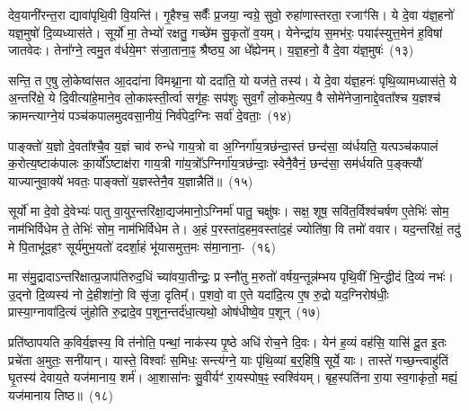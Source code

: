 देव॒यानी॑रन्त॒रा द्यावा॑\-पृथि॒वी वि॒यन्ति॑। गृ॒हैश्च॒ सर्वैः᳚ प्र॒जया॒ न्वग्रे॒ सुवो॒ रुहा॑णास्तरता॒ रजाꣳ॑सि। ये दे॒वा य॑ज्ञ॒हनो॑ यज्ञ॒मुषो॑ दि॒व्यध्यास॑ते। सूर्यो॑ मा॒ तेभ्यो॑ रक्षतु॒ गच्छे॑म सु॒कृतो॑ व॒यम्। येनेन्द्रा॑य स॒मभ॑रः॒ पयाꣴ॑स्युत्त॒\-मेन॑ ह॒विषा॑ जातवेदः। तेना᳚ग्ने॒ त्वमु॒त व॑र्धये॒मꣳ स॑जा॒ताना॒ꣴ॒ श्रैष्ठ्य॒ आ धे᳚ह्येनम्। य॒ज्ञ॒हनो॒ वै दे॒वा य॑ज्ञ॒मुषः॑~(१३)\ip

सन्ति॒ त ए॒षु लो॒केष्वा॑सत आ॒ददा॑ना विमथ्ना॒ना यो ददा॑ति॒ यो यज॑ते॒ तस्य॑। ये दे॒वा य॑ज्ञ॒हनः॑ पृथि॒व्यामध्यास॑ते॒ ये अ॒न्तरि॑क्षे॒ ये दि॒वीत्या॑हे॒माने॒व लो॒काꣴस्ती॒र्त्वा सगृ॑हः॒ सप॑शुः सुव॒र्गं लो॒कमे॒त्यप॒ वै सोमे॑नेजा॒नाद्दे॒वता᳚श्च य॒ज्ञश्च॑ क्रामन्त्याग्ने॒यं पञ्च॑कपालमुदवसा॒नीयं॒ निर्व॑पेद॒ग्निः सर्वा॑ दे॒वताः॒~(१४)\ip

पाङ्क्तो॑ य॒ज्ञो दे॒वता᳚श्चै॒व य॒ज्ञं चाव॑ रुन्धे गाय॒त्रो वा अ॒ग्निर्गा॑य॒त्रछ॑न्दा॒स्तं छन्द॑सा॒ व्य॑र्धयति॒ यत्पञ्च॑कपालं क॒रोत्य॒ष्टाक॑पालः का॒र्यो᳚\-ऽष्टाक्ष॑रा गाय॒त्री गा॑य॒त्रो᳚\-ऽग्निर्गा॑य॒त्रछ॑न्दाः॒ स्वेनै॒वैनं॒ छन्द॑सा॒ सम॑र्धयति प॒ङ्क्त्यौ॑ याज्यानुवा॒क्ये॑ भवतः॒ पाङ्क्तो॑ य॒ज्ञस्तेनै॒व य॒ज्ञान्नैति॑॥~(१५)\ip

{\anuvakamend[{स॒वि॒त॒र्दे॒वा य॑ज्ञ॒मुषः॒ सर्वा॑ दे॒वता॒स्त्रिच॑त्वारिꣳशच्च}]}

सूर्यो॑ मा दे॒वो दे॒वेभ्यः॑ पातु वा॒युर॒न्तरि॑क्षा॒द्यज॑मानो॒\-ऽग्निर्मा॑ पातु॒ चक्षु॑षः। सक्ष॒ शूष॒ सवि॑त॒र्विश्व॑चर्\mbox{}षण ए॒तेभिः॑ सोम॒ नाम॑भिर्विधेम ते॒ तेभिः॑ सोम॒ नाम॑भिर्विधेम ते। अ॒हं प॒रस्ता॑द॒हम॒वस्ता॑द॒हं ज्योति॑षा॒ वि तमो॑ ववार। यद॒न्तरि॑क्षं॒ तदु॑ मे पि॒ताभू॑द॒हꣳ सूर्य॑मुभ॒यतो॑ ददर्\mbox{}शा॒हं भू॑यासमुत्त॒मः स॑मा॒नाना॒-~(१६)\ip

मा स॑मु॒द्रादा\-ऽन्तरि॑क्षात्प्र॒जा\-प॑तिरुद॒धिं च्या॑वया॒तीन्द्रः॒ प्र स्नौ॑तु म॒रुतो॑ वर्\mbox{}षय॒न्तून्न॑म्भय पृथि॒वीं भि॒न्द्धीदं दि॒व्यं नभः॑। उ॒द्नो दि॒व्यस्य॑ नो दे॒हीशा॑नो॒ वि सृ॑जा॒ दृतिम्᳚। प॒शवो॒ वा ए॒ते यदा॑दि॒त्य ए॒ष रु॒द्रो यद॒ग्निरोष॑धीः॒ प्रास्या॒ग्नावा॑दि॒त्यं जु॑होति रु॒द्रादे॒व प॒शून॒न्तर्द॑धा॒त्यथो॒ ओष॑धीष्वे॒व प॒शून्~(१७)\ip

प्रति॑\-ष्ठापयति क॒विर्य॒ज्ञस्य॒ वि त॑नोति॒ पन्थां॒ नाक॑स्य पृ॒ष्ठे अधि॑ रोच॒ने दि॒वः। येन॑ ह॒व्यं वह॑सि॒ यासि॑ दू॒त इ॒तः प्रचे॑ता अ॒मुतः॒ सनी॑यान्। यास्ते॒ विश्वाः᳚ स॒मिधः॒ सन्त्य॑ग्ने॒ याः पृ॑थि॒व्यां ब॒र्॒\mbox{}हिषि॒ सूर्ये॒ याः। तास्ते॑ गच्छ॒न्त्वाहु॑तिं घृ॒तस्य॑ देवाय॒ते यज॑मानाय॒ शर्म॑। आ॒शासा॑नः सु॒वीर्यꣳ॑ रा॒यस्पोष॒ꣴ॒ स्वश्वि॑यम्। बृह॒स्पति॑ना रा॒या स्व॒गाकृ॑तो॒ मह्यं॒ यज॑मानाय तिष्ठ॥~(१८)\ip

{\anuvakamend[{स॒मा॒नाना॒मोष॑धीष्वे॒व प॒शून्मह्यं॒ यज॑माना॒यैक॑ञ्च}]}

